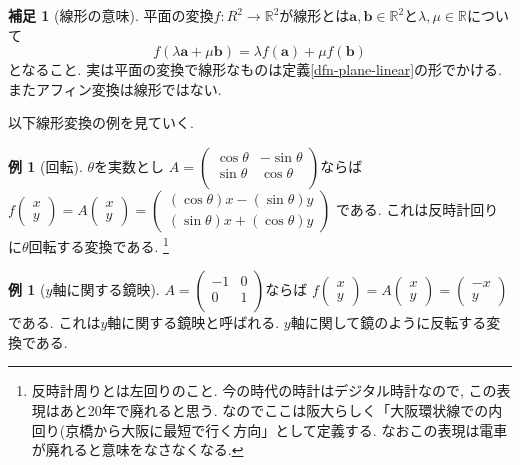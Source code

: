 \documentclass[dvipdfmx,a4paper,11pt]{article}
\newcommand{\R}{\mathbb{R}}
\theoremstyle{definition}
\newtheorem{rem}[thm]{補足}
\newtheorem{exa}[thm]{例}
\begin{document}
\begin{rem}[線形の意味]
平面の変換$f : R^2 \to \R^2$が線形とは$\bm{a}, \bm{b} \in \R^2$と$\lambda, \mu \in \R$について
$$
f(\lambda \bm{a} + \mu \bm{b})
=
\lambda f(\bm{a}) + \mu f(\bm{b})
$$
となること. 
実は平面の変換で線形なものは定義\ref{dfn-plane-linear}の形でかける.
またアフィン変換は線形ではない. 
\end{rem}

以下線形変換の例を見ていく. 

 \begin{exa}[回転]
   $\theta$を実数とし
$
A=\begin{pmatrix}
\cos \theta & -\sin \theta\\
\sin \theta& \cos \theta  \\
\end{pmatrix}
$ならば
$
f\begin{pmatrix}
x \\ y
 \end{pmatrix} 
 =
 A
\begin{pmatrix}
x \\ y
 \end{pmatrix}  = 
 \begin{pmatrix}
(\cos \theta ) x - (\sin \theta )y \\
(\sin \theta ) x + (\cos \theta )y 
 \end{pmatrix}
$
である. これは反時計回りに$\theta$回転する変換である. \footnote{反時計周りとは左回りのこと. 今の時代の時計はデジタル時計なので, この表現はあと20年で廃れると思う. なのでここは阪大らしく「大阪環状線での内回り(京橋から大阪に最短で行く方向」として定義する. なおこの表現は電車が廃れると意味をなさなくなる. }
\end{exa}


 \begin{exa}[$y$軸に関する鏡映]
$
A=\begin{pmatrix}
-1& 0 \\
0& 1 \\
\end{pmatrix}
$ならば
$
f\begin{pmatrix}
x \\ y
 \end{pmatrix} 
 =
 A
\begin{pmatrix}
x \\ y
 \end{pmatrix}  = 
 \begin{pmatrix}
-x \\y
 \end{pmatrix}
$
である. これは$y$軸に関する鏡映と呼ばれる. $y$軸に関して鏡のように反転する変換である. 
\end{exa}
\end{document}
